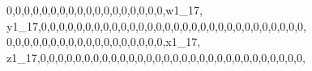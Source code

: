 \documentclass[]{article}
\newenvironment{Shaded}{\begin{snugshade}}{\end{snugshade}}
\newcommand{\DecValTok}[1]{\textcolor[rgb]{0.00,0.00,0.81}{#1}}
\newcommand{\NormalTok}[1]{#1}
\begin{document}
\begin{Shaded}
\begin{Highlighting}[]
\DecValTok{0}\NormalTok{,}\DecValTok{0}\NormalTok{,}\DecValTok{0}\NormalTok{,}\DecValTok{0}\NormalTok{,}\DecValTok{0}\NormalTok{,}\DecValTok{0}\NormalTok{,}\DecValTok{0}\NormalTok{,}\DecValTok{0}\NormalTok{,}\DecValTok{0}\NormalTok{,}\DecValTok{0}\NormalTok{,}\DecValTok{0}\NormalTok{,}\DecValTok{0}\NormalTok{,}\DecValTok{0}\NormalTok{,}\DecValTok{0}\NormalTok{,}\DecValTok{0}\NormalTok{,}\DecValTok{0}\NormalTok{,}\DecValTok{0}\NormalTok{,}\DecValTok{0}\NormalTok{,w1_}\DecValTok{17}\NormalTok{, y1_}\DecValTok{17}\NormalTok{,}\DecValTok{0}\NormalTok{,}\DecValTok{0}\NormalTok{,}\DecValTok{0}\NormalTok{,}\DecValTok{0}\NormalTok{,}\DecValTok{0}\NormalTok{,}\DecValTok{0}\NormalTok{,}\DecValTok{0}\NormalTok{,}\DecValTok{0}\NormalTok{,}\DecValTok{0}\NormalTok{,}\DecValTok{0}\NormalTok{,}\DecValTok{0}\NormalTok{,}\DecValTok{0}\NormalTok{,}\DecValTok{0}\NormalTok{,}\DecValTok{0}\NormalTok{,}\DecValTok{0}\NormalTok{,}\DecValTok{0}\NormalTok{,}\DecValTok{0}\NormalTok{,}\DecValTok{0}\NormalTok{,}\DecValTok{0}\NormalTok{,}\DecValTok{0}\NormalTok{,}\DecValTok{0}\NormalTok{,}\DecValTok{0}\NormalTok{,}\DecValTok{0}\NormalTok{,}\DecValTok{0}\NormalTok{,}\DecValTok{0}\NormalTok{,}\DecValTok{0}\NormalTok{,}\DecValTok{0}\NormalTok{,}\DecValTok{0}\NormalTok{,}\DecValTok{0}\NormalTok{,}\DecValTok{0}\NormalTok{,}
\DecValTok{0}\NormalTok{,}\DecValTok{0}\NormalTok{,}\DecValTok{0}\NormalTok{,}\DecValTok{0}\NormalTok{,}\DecValTok{0}\NormalTok{,}\DecValTok{0}\NormalTok{,}\DecValTok{0}\NormalTok{,}\DecValTok{0}\NormalTok{,}\DecValTok{0}\NormalTok{,}\DecValTok{0}\NormalTok{,}\DecValTok{0}\NormalTok{,}\DecValTok{0}\NormalTok{,}\DecValTok{0}\NormalTok{,}\DecValTok{0}\NormalTok{,}\DecValTok{0}\NormalTok{,}\DecValTok{0}\NormalTok{,}\DecValTok{0}\NormalTok{,}\DecValTok{0}\NormalTok{,x1_}\DecValTok{17}\NormalTok{, z1_}\DecValTok{17}\NormalTok{,}\DecValTok{0}\NormalTok{,}\DecValTok{0}\NormalTok{,}\DecValTok{0}\NormalTok{,}\DecValTok{0}\NormalTok{,}\DecValTok{0}\NormalTok{,}\DecValTok{0}\NormalTok{,}\DecValTok{0}\NormalTok{,}\DecValTok{0}\NormalTok{,}\DecValTok{0}\NormalTok{,}\DecValTok{0}\NormalTok{,}\DecValTok{0}\NormalTok{,}\DecValTok{0}\NormalTok{,}\DecValTok{0}\NormalTok{,}\DecValTok{0}\NormalTok{,}\DecValTok{0}\NormalTok{,}\DecValTok{0}\NormalTok{,}\DecValTok{0}\NormalTok{,}\DecValTok{0}\NormalTok{,}\DecValTok{0}\NormalTok{,}\DecValTok{0}\NormalTok{,}\DecValTok{0}\NormalTok{,}\DecValTok{0}\NormalTok{,}\DecValTok{0}\NormalTok{,}\DecValTok{0}\NormalTok{,}\DecValTok{0}\NormalTok{,}\DecValTok{0}\NormalTok{,}\DecValTok{0}\NormalTok{,}\DecValTok{0}\NormalTok{,}\DecValTok{0}\NormalTok{,}\DecValTok{0}\NormalTok{,}

\end{Highlighting}
\end{Shaded}
\end{document}
